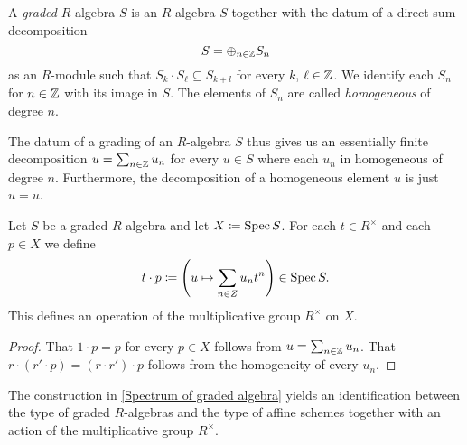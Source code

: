 \begin{definition}
  A \emph{graded} $R$-algebra $S$ is an $R$-algebra $S$ together with the datum of a direct sum decomposition
  \begin{equation*}
    S = \oplus_{n \in \mathbb{Z}} S_n
  \end{equation*}
  as an $R$-module such that $S_k \cdot S_\ell \subseteq S_{k + l}$
  for every $k$, $\ell \in \mathbb{Z}$.  We identify each $S_n$ for $n \in \mathbb{Z}$
  with its image in $S$.  The elements of $S_n$ are called \emph{homogeneous} of degree $n$.
\end{definition}

\begin{remark}
  The datum of a grading of an $R$-algebra $S$ thus gives us an
  essentially finite decomposition $u = \sum_{n \in \mathbb{Z}} u_n$ for every
  $u \in S$ where each $u_n$ in homogeneous of degree $n$.
  Furthermore, the decomposition of a homogeneous element $u$ is just $u = u$.
\end{remark}

\begin{proposition}
  \label{Spectrum of graded algebra}
  Let $S$ be a graded $R$-algebra and let $X \coloneqq \operatorname{Spec} S$.  For each $t \in R^\times$ and each $p \in X$ we define
  \begin{equation*}
    t \cdot p \coloneqq \left(u \mapsto \sum_{n \in Z} u_n t^n\right) \in \operatorname{Spec} S.
  \end{equation*}
  This defines an operation of the multiplicative group $R^\times$ on $X$.
\end{proposition}

\begin{proof}
  That $1 \cdot p = p$ for every $p \in X$ follows from
  $u = \sum_{n \in \mathbb{Z}} u_n$.  That
  $r \cdot (r' \cdot p) = (r \cdot r') \cdot p$ follows from the
  homogeneity of every $u_n$.
\end{proof}

\begin{theorem}
  The construction in \cref{Spectrum of graded algebra} yields an
  identification between the type of graded $R$-algebras and the type
  of affine schemes together with an action of the multiplicative
  group $R^\times$.
\end{theorem}

